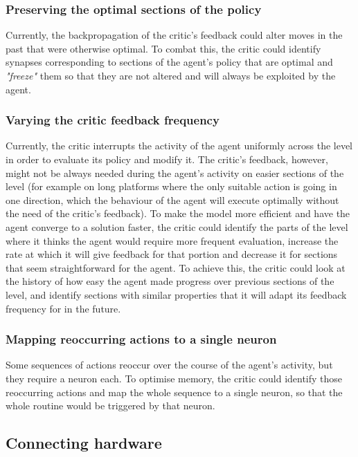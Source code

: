 \documentclass[10pt]{article}
\begin{document}
    \subsubsection{Preserving the optimal sections of the policy}

    Currently, the backpropagation of the critic's feedback could alter moves in the past that were otherwise optimal. To combat this, the critic could identify synapses corresponding to sections of the agent's policy that are optimal and \textit{"freeze"} them so that they are not altered and will always be exploited by the agent.

    \subsubsection{Varying the critic feedback frequency}

    Currently, the critic interrupts the activity of the agent uniformly across the level in order to evaluate its policy and modify it. The critic's feedback, however, might not be always needed during the agent's activity on easier sections of the level (for example on long platforms where the only suitable action is going in one direction, which the behaviour of the agent will execute optimally without the need of the critic's feedback). To make the model more efficient and have the agent converge to a solution faster, the critic could identify the parts of the level where it thinks the agent would require more frequent evaluation, increase the rate at which it will give feedback for that portion and decrease it for sections that seem straightforward for the agent. To achieve this, the critic could look at the history of how easy the agent made progress over previous sections of the level, and identify sections with similar properties that it will adapt its feedback frequency for in the future.

    \subsubsection{Mapping reoccurring actions to a single neuron}

    Some sequences of actions reoccur over the course of the agent's activity, but they require a neuron each. To optimise memory, the critic could identify those reoccurring actions and map the whole sequence to a single neuron, so that the whole routine would be triggered by that neuron.

    \subsection{Connecting hardware}
\end{document}
